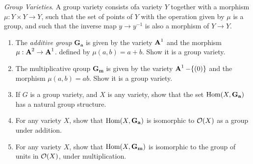 \documentclass[10pt]{amsart}
\begin{document}
\begin{exercise}[3.21]
    \emph{Group Varieties}. A group variety consists ofa variety $Y$ together with a morphism $\mu: Y \times Y \to Y$, 
    such that the set of points of $Y$ with the operation given by $\mu$ is a group, and such that the inverse 
    map $y \to y^{-1}$ is also a morphism of $Y \to Y$.
    \begin{enumerate}[itemsep=2pt]
        \item The \emph{additive group} $\mathbf{G_a}$ is given by the variety $\aa^1$ 
        and the morphism $\mu: \aa^2 \to \aa^1$.
        defined by $\mu(a,b) = a + b$. Show it is a group variety.
        \item The multiplicative qroup $\mathbf{G_m}$ is given by the variety $\aa^1 - \{(0)\}$ and the 
        morphism $\mu(a, b) = ab$. Show it is a group variety.
        \item If $G$ is a group variety, and $X$ is any variety, show that the set $\Hom(X, \mathbf{G_a})$ has 
        a natural group structure.
        \item For any variety $X$, show that $\Hom(X,\mathbf{G_a})$ is isomorphic to $\cO(X)$ as a group
        under addition.
        \item For any variety $X$, show that $\Hom(X,\mathbf{G_m})$ is isomorphic to the group of units
        in $\cO(X)$, under multiplication.
    \end{enumerate}
\end{exercise}
\end{document}
